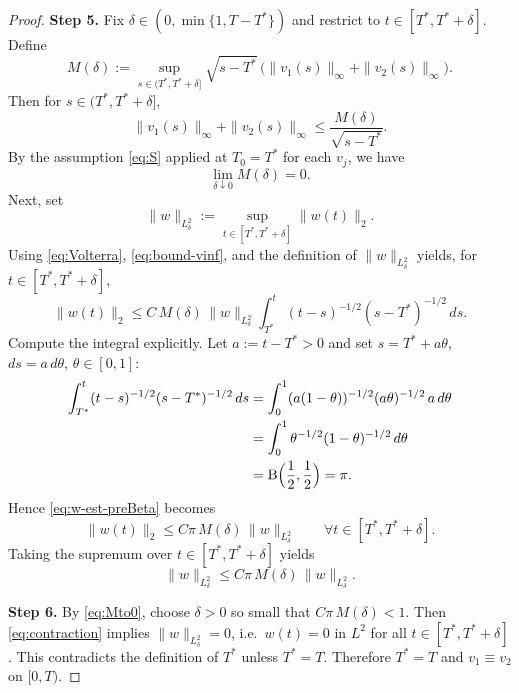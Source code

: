 \documentclass[10pt,a4paper]{amsart}
\begin{document}
\begin{proof}
\textbf{Step 5.}
Fix $\delta\in(0,\min\{1,T-T^*\})$ and restrict to $t\in[T^*,T^*+\delta]$. Define
\begin{equation}\label{eq:Mdelta}
M(\delta):=\sup_{s\in(T^*,T^*+\delta]}\sqrt{s-T^*}\,\bigl(\|v_1(s)\|_\infty+\|v_2(s)\|_\infty\bigr).
\end{equation}
Then for $s\in(T^*,T^*+\delta]$,
\begin{equation}\label{eq:bound-vinf}
\|v_1(s)\|_\infty+\|v_2(s)\|_\infty\le \frac{M(\delta)}{\sqrt{s-T^*}}.
\end{equation}
By the assumption \eqref{eq:S} applied at $T_0=T^*$ for each $v_j$, we have
\begin{equation}\label{eq:Mto0}
\lim_{\delta\downarrow 0} M(\delta)=0.
\end{equation}
Next, set
\[
\|w\|_{L^2_\delta}:=\sup_{t\in[T^*,T^*+\delta]}\|w(t)\|_2.
\]
Using \eqref{eq:Volterra}, \eqref{eq:bound-vinf}, and the definition of $\|w\|_{L^2_\delta}$ yields, for $t\in[T^*,T^*+\delta]$,
\begin{equation}\label{eq:w-est-preBeta}
\|w(t)\|_2
\le C\,M(\delta)\,\|w\|_{L^2_\delta}\int_{T^*}^{t}(t-s)^{-1/2}(s-T^*)^{-1/2}\,ds.
\end{equation}
Compute the integral explicitly. Let $a:=t-T^*>0$ and set $s=T^*+a\theta$, $ds=a\,d\theta$, $\theta\in[0,1]$:
\begin{align*}
\int_{T^*}^{t}(t-s)^{-1/2}(s-T^*)^{-1/2}\,ds
&=\int_0^1 (a(1-\theta))^{-1/2}(a\theta)^{-1/2}\,a\,d\theta\\
&=\int_0^1 \theta^{-1/2}(1-\theta)^{-1/2}\,d\theta\\
&=\mathrm{B}\Bigl(\frac12,\frac12\Bigr)=\pi.
\end{align*}
Hence \eqref{eq:w-est-preBeta} becomes
\[
\|w(t)\|_2\le C\pi\,M(\delta)\,\|w\|_{L^2_\delta}\qquad\forall t\in[T^*,T^*+\delta].
\]
Taking the supremum over $t\in[T^*,T^*+\delta]$ yields
\begin{equation}\label{eq:contraction}
\|w\|_{L^2_\delta}\le C\pi\,M(\delta)\,\|w\|_{L^2_\delta}.
\end{equation}

\textbf{Step 6.}
By \eqref{eq:Mto0}, choose $\delta>0$ so small that $C\pi\,M(\delta)<1$. Then \eqref{eq:contraction} implies
$\|w\|_{L^2_\delta}=0$, i.e.\ $w(t)=0$ in $L^2$ for all $t\in[T^*,T^*+\delta]$.
This contradicts the definition of $T^*$ unless $T^*=T$. Therefore $T^*=T$ and $v_1\equiv v_2$ on $[0,T)$.
\end{proof}
\end{document}
